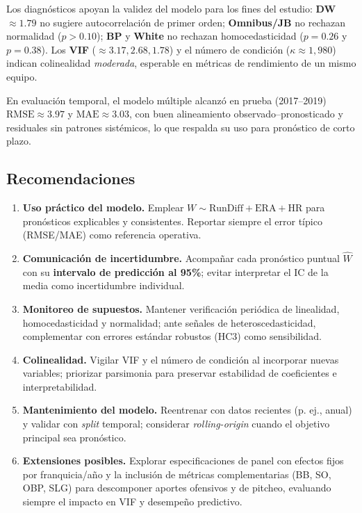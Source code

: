\documentclass[man,floatsintext]{apa7}
\begin{document}
Los diagnósticos apoyan la validez del modelo para los fines del estudio: \textbf{DW}\(\approx1.79\) no sugiere autocorrelación de primer orden; \textbf{Omnibus/JB} no rechazan normalidad (\(p>0.10\)); \textbf{BP} y \textbf{White} no rechazan homocedasticidad (\(p=0.26\) y \(p=0.38\)). Los \textbf{VIF} (\(\approx3.17, 2.68, 1.78\)) y el número de condición (\(\kappa\approx1{,}980\)) indican colinealidad \emph{moderada}, esperable en métricas de rendimiento de un mismo equipo.

En evaluación temporal, el modelo múltiple alcanzó en prueba (2017--2019) \(\text{RMSE}\approx3.97\) y \(\text{MAE}\approx3.03\), con buen alineamiento observado–pronosticado y residuales sin patrones sistémicos, lo que respalda su uso para pronóstico de corto plazo.

\subsection{Recomendaciones}
\begin{enumerate}
    \item \textbf{Uso práctico del modelo.} Emplear \(W \sim \text{RunDiff} + \text{ERA} + \text{HR}\) para pronósticos explicables y consistentes. Reportar siempre el error típico (RMSE/MAE) como referencia operativa.
    \item \textbf{Comunicación de incertidumbre.} Acompañar cada pronóstico puntual \(\hat W\) con su \textbf{intervalo de predicción al 95\%}; evitar interpretar el IC de la media como incertidumbre individual.
    \item \textbf{Monitoreo de supuestos.} Mantener verificación periódica de linealidad, homocedasticidad y normalidad; ante señales de heteroscedasticidad, complementar con errores estándar robustos (HC3) como sensibilidad.
    \item \textbf{Colinealidad.} Vigilar VIF y el número de condición al incorporar nuevas variables; priorizar parsimonia para preservar estabilidad de coeficientes e interpretabilidad.
    \item \textbf{Mantenimiento del modelo.} Reentrenar con datos recientes (p. ej., anual) y validar con \emph{split} temporal; considerar \emph{rolling-origin} cuando el objetivo principal sea pronóstico.
    \item \textbf{Extensiones posibles.} Explorar especificaciones de panel con efectos fijos por franquicia/año y la inclusión de métricas complementarias (BB, SO, OBP, SLG) para descomponer aportes ofensivos y de pitcheo, evaluando siempre el impacto en VIF y desempeño predictivo.
\end{enumerate}
\end{document}
